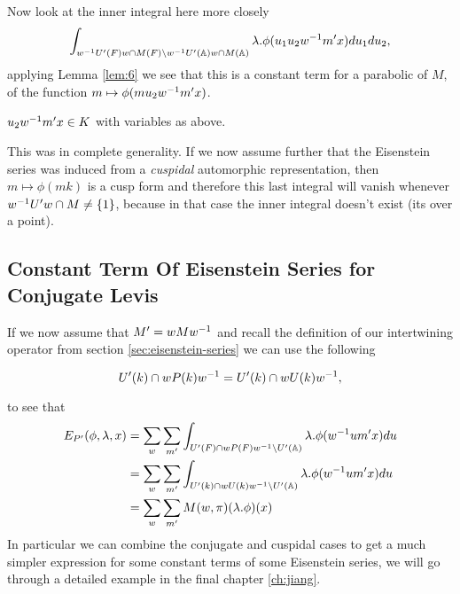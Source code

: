      Now look at the inner integral here more closely 
    \[ \int_{w\inv U'(F) w \cap M(F) \setminus w\inv U'(\A)w \cap M(\A)}\lambda. \phi( u_1 u_2 w\inv m' x)  du_1 du_2,\]
    applying Lemma \ref{lem:6} we see that this is a constant term for a parabolic of \(M\), of the function \(m\mapsto \phi(m u_2 w\inv m' x)\). 
    \begin{Lemma}
        \(u_2 w^{-1} m' x \in K\) with variables as above.
    \end{Lemma}
    This was in complete generality. If we now assume further that the Eisenstein series was induced from a \textit{cuspidal} automorphic representation, then \(m\mapsto \phi(mk)\) is a cusp form and therefore this last integral will vanish whenever \(w^{-1} U'w \cap M \neq \{1\}\), because in that case the inner integral doesn't exist (its over a point).

    \subsection{Constant Term Of Eisenstein Series for Conjugate Levis}\label{constant_conjugate_levi}
    If we now assume that \(M' = wMw^{-1}\) and recall the definition of our intertwining operator from section \ref{sec:eisenstein-series} we can use the following 
    \begin{Lemma}
        \[U'(k) \cap wP(k) w^{-1} = U'(k) \cap wU(k)w^{-1},\]
    \end{Lemma}
    to see that 
    \begin{equation*}
        \begin{aligned}
             E_{P'}( \phi, \lambda, x) &= \sum_{ w} \sum_{m'} \int_{U'(F)\cap wP(F)w\inv \setminus U'(\A)} \lambda.\phi( w\inv um' x)  du \\
             &=  \sum_{ w} \sum_{m'} \int_{U'(k) \cap wU(k)w\inv \setminus U'(\A)} \lambda.\phi( w\inv um' x)  du \\
             &= \sum_{ w} \sum_{m'} M(w, \pi)(\lambda.\phi)(x)
        \end{aligned}
    \end{equation*}
    In particular we can combine the conjugate and cuspidal cases to get a much simpler expression for some constant terms of some Eisenstein series, we will go through a detailed example in the final chapter \ref{ch:jiang}.
    


    